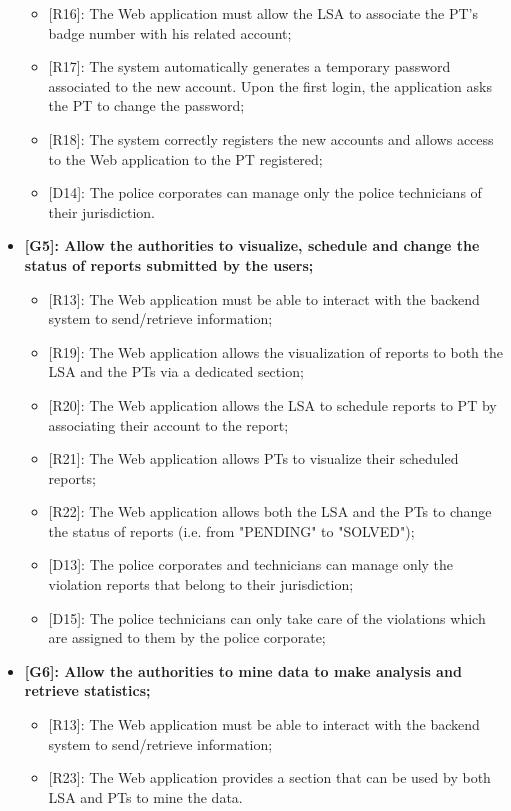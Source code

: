 \begin{itemize}
\begin{itemize}
      \item {[R16]}: The Web application must allow the LSA to associate the PT's badge number with his related account;
      \item {[R17]}: The system automatically generates a temporary password associated to the new account. Upon the first login, the application asks the PT to change the password;
      \item {[R18]}: The system correctly registers the new accounts and allows access to the Web application to the PT registered;  
      \item {[D14]}: The police corporates can manage only the police technicians of their jurisdiction.     
    \end{itemize}
  \item \textbf{{[G5]}: Allow the authorities to visualize, schedule and change the status of reports submitted by the users;}
    \begin{itemize}
      \item {[R13]}: The Web application must be able to interact with the backend system to send/retrieve information;
      \item {[R19]}: The Web application allows the visualization of reports to both the LSA and the PTs via a dedicated section;
      \item {[R20]}: The Web application allows the LSA to schedule reports to PT by associating their account to the report;
      \item {[R21]}: The Web application allows PTs to visualize their scheduled reports;
      \item {[R22]}: The Web application allows both the LSA and the PTs to change the status of reports (i.e. from "PENDING" to "SOLVED");
      \item {[D13]}: The police corporates and technicians can manage only the violation reports that belong to their jurisdiction;
      \item {[D15]}: The police technicians can only take care of the violations which are assigned to them by the police corporate;
    \end{itemize}
  \item \textbf{{[G6]}: Allow the authorities to mine data to make analysis and retrieve statistics;}
    \begin{itemize}
      \item {[R13]}: The Web application must be able to interact with the backend system to send/retrieve information;
      \item {[R23]}: The Web application provides a section that can be used by both LSA and PTs to mine the data.

\end{itemize}
\end{itemize}
